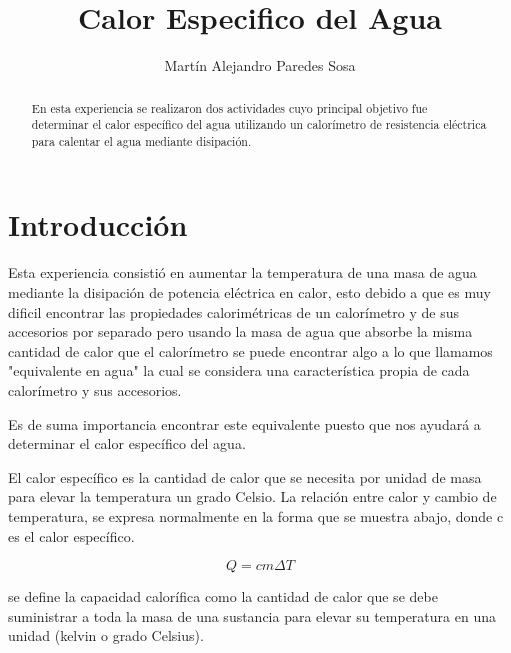\documentclass[12pt]{article}
\title{Calor Especifico del Agua}
\author{Martín Alejandro Paredes Sosa}
\makeatletter
\let\thetitle\@title
\let\theauthor\@author
\makeatother
\begin{document}
\begin{center}
{ \large \bfseries \thetitle}
\end{center}
	\begin{minipage}{\textwidth}
		\begin{center} 
			\theauthor 
			\end{center}
	\end{minipage}
	
\begin{abstract}
En esta experiencia se realizaron dos actividades cuyo principal objetivo fue determinar el calor específico del agua utilizando un calorímetro de resistencia eléctrica para calentar el agua mediante disipación.
\end{abstract}
\vspace{-1cm}
\section{Introducción}
\vspace{-0.5cm}
Esta experiencia consistió en aumentar la temperatura de una masa de agua mediante la disipación de potencia eléctrica en calor, esto debido a que es muy dificil encontrar las propiedades calorimétricas de un calorímetro y de sus accesorios por separado pero usando la masa de agua que absorbe la misma cantidad de calor que el calorímetro se puede encontrar algo a lo que llamamos "equivalente en agua" la cual se considera una característica propia de cada calorímetro y sus accesorios.

Es de suma importancia encontrar este equivalente puesto que nos ayudará  a determinar el calor específico del agua.

El calor específico es la cantidad de calor que se necesita por unidad de masa para elevar la temperatura un grado Celsio. La relación entre calor y cambio de temperatura, se expresa normalmente en la forma que se muestra abajo, donde c es el calor específico.

\begin{equation}
Q = c m\Delta T
\end{equation}


se define la capacidad calorífica como la cantidad de calor que se debe suministrar a toda la masa de una sustancia para elevar su temperatura en una unidad (kelvin o grado Celsius).
\end{document}
